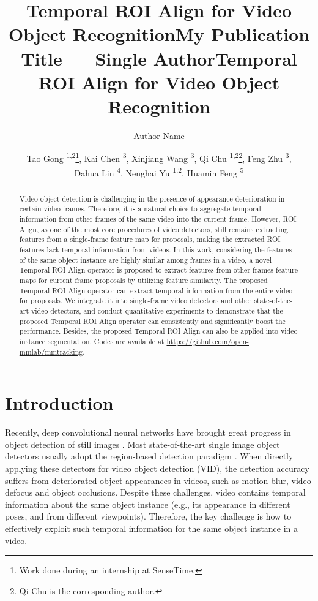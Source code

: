 \documentclass[letterpaper]{article} \usepackage{aaai21}  \usepackage{times}  \usepackage{helvet} \usepackage{courier}  \usepackage[hyphens]{url}  \usepackage{graphicx} \usepackage{hyperref}
\title{Temporal ROI Align for Video Object Recognition}
\author {
}
\title{My Publication Title --- Single Author}
\author {
Author Name \\
}
\title{Temporal ROI Align for Video Object Recognition}
\author {
Tao Gong \textsuperscript{\rm 1,}\textsuperscript{\rm 2}\thanks{Work done during an internship at SenseTime.},
        Kai Chen \textsuperscript{\rm 3},
        Xinjiang Wang \textsuperscript{\rm 3},
				 Qi Chu \textsuperscript{\rm 1,}\textsuperscript{\rm 2}\thanks{Qi Chu is the corresponding author.},
				 Feng Zhu \textsuperscript{\rm 3},\\
        Dahua Lin \textsuperscript{\rm 4},
        Nenghai Yu \textsuperscript{\rm 1,}\textsuperscript{\rm 2},
				 Huamin Feng \textsuperscript{\rm 5}\\
}
\begin{document}
\maketitle

\begin{abstract}
Video object detection is challenging in the presence of appearance deterioration in certain video frames. Therefore, it is a natural choice to aggregate temporal information from other frames of the same video into the current frame. However, ROI Align, as one of the most core procedures of video detectors, still remains extracting features from a single-frame feature map for proposals, making the extracted ROI features lack temporal information from videos. In this work, considering the features of the same object instance are highly similar among frames in a video, a novel Temporal ROI Align operator is proposed to extract features from other frames feature maps for current frame proposals by utilizing feature similarity. The proposed Temporal ROI Align operator can extract temporal information from the entire video for proposals. We integrate it into single-frame video detectors and other state-of-the-art video detectors, and conduct quantitative experiments to demonstrate that the proposed Temporal ROI Align operator can consistently and significantly boost the performance. Besides, the proposed Temporal ROI Align can also be applied into video instance segmentation. Codes are available at \href{https://github.com/open-mmlab/mmtracking}{https://github.com/open-mmlab/mmtracking}.
\end{abstract}
 \vspace{-0.35cm}
\section{Introduction}
Recently, deep convolutional neural networks have brought great progress in object detection of still images \cite{ren2015faster,lin2017focal,Cai_2018_CVPR,tian2019fcos,duan2019centernet}. Most state-of-the-art single image object detectors usually adopt the region-based detection paradigm \cite{ren2015faster,Cai_2018_CVPR}.
When directly applying these detectors for video object detection (VID), the detection accuracy suffers from deteriorated object appearances in videos, such as motion blur, video defocus and object occlusions. Despite these challenges, video contains temporal information about the same object instance (e.g., its appearance in different poses, and from different viewpoints). Therefore, the key challenge is how to effectively exploit such temporal information for the same object instance in a video.
\end{document}
